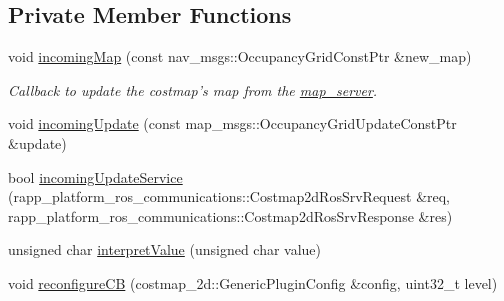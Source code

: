 \subsection*{Private Member Functions}
\begin{DoxyCompactItemize}
\item 
void \hyperlink{classcostmap__2d_1_1RappStaticLayer_a02c7a4b33b54c1831b8755f3a1817705}{incoming\-Map} (const nav\-\_\-msgs\-::\-Occupancy\-Grid\-Const\-Ptr \&new\-\_\-map)
\begin{DoxyCompactList}\small\item\em Callback to update the costmap's map from the \hyperlink{namespacemap__server}{map\-\_\-server}. \end{DoxyCompactList}\item 
void \hyperlink{classcostmap__2d_1_1RappStaticLayer_a59db2ea6f0a661cdfed0f83e410d92c2}{incoming\-Update} (const map\-\_\-msgs\-::\-Occupancy\-Grid\-Update\-Const\-Ptr \&update)
\item 
bool \hyperlink{classcostmap__2d_1_1RappStaticLayer_af9862dc861d72fff8f408b8d9b4114dc}{incoming\-Update\-Service} (rapp\-\_\-platform\-\_\-ros\-\_\-communications\-::\-Costmap2d\-Ros\-Srv\-Request \&req, rapp\-\_\-platform\-\_\-ros\-\_\-communications\-::\-Costmap2d\-Ros\-Srv\-Response \&res)
\item 
unsigned char \hyperlink{classcostmap__2d_1_1RappStaticLayer_a444e0b1ef1ca6763001390c555e7eca4}{interpret\-Value} (unsigned char value)
\item 
void \hyperlink{classcostmap__2d_1_1RappStaticLayer_a041586185fa7f670236c9b95efbbc7e9}{reconfigure\-C\-B} (costmap\-\_\-2d\-::\-Generic\-Plugin\-Config \&config, uint32\-\_\-t level)
\end{DoxyCompactItemize}
